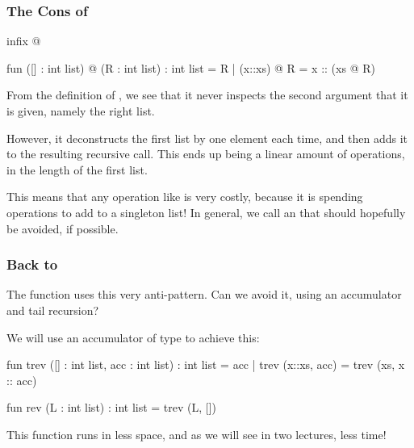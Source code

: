 \documentclass[aspectratio=169, handout]{beamer}
\begin{document}
\begin{frame}[fragile]
  \frametitle{The Cons of }

  \begin{codeblock}
    infix @

    fun ([] : int list) @ (R : int list) : int list = R
      | (x::xs) @ R = x :: (xs @ R)
  \end{codeblock}

  \pause
  From the definition of , we see that it never inspects the second argument that it
  is given, namely the right list.

  \pause
  \vspace{\fill}

  However, it deconstructs the first list by one element each time, and then adds it to the
  resulting recursive call. This ends up being a linear amount of operations, in the length
  of the first list.

  \pause
  \vspace{\fill}

  This means that any operation like  is very costly, because it is spending
   operations to add to a singleton list! In general, we call  an
   that should hopefully be avoided, if possible.
\end{frame}

\begin{frame}[fragile]
  \frametitle{Back to }

  The  function uses this very anti-pattern. Can we avoid it, using an accumulator
  and tail recursion?

  \pause
  \vspace{\fill}

  We will use an accumulator of type  to achieve this:

  \pause
  \begin{codeblock}
    fun trev ([] : int list, acc : int list) : int list = acc
      | trev (x::xs, acc) = trev (xs, x :: acc)

    fun rev (L : int list) : int list = trev (L, [])
  \end{codeblock}

  \pause
  \vspace{\fill}

  This  function runs in less space, and as we will see in two lectures,
  less time!
\end{frame}



\thankyou
\end{document}
